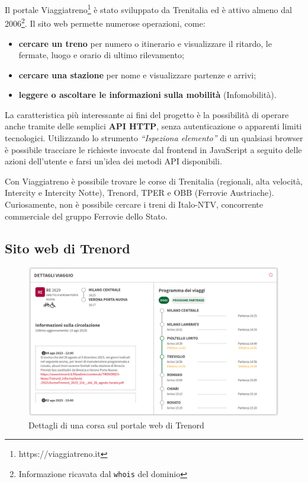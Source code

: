 \documentclass[12pt,italian]{report}
\begin{document}
Il portale Viaggiatreno\footnote{https://viaggiatreno.it} è stato
sviluppato da Trenitalia ed è attivo almeno dal
2006\footnote{Informazione ricavata dal \texttt{whois} del dominio}.
Il sito web permette numerose operazioni, come:
\begin{itemize}
	\item \textbf{cercare un treno} per numero o itinerario e
    visualizzare il ritardo, le fermate, luogo e orario di ultimo
    rilevamento;
	\item \textbf{cercare una stazione} per nome e visualizzare
    partenze e arrivi;
	\item \textbf{leggere o ascoltare le informazioni sulla mobilità}
    (Infomobilità).
\end{itemize}

La caratteristica più interessante ai fini del progetto è la
possibilità di operare anche tramite delle semplici \textbf{API HTTP},
senza autenticazione o apparenti limiti tecnologici.  Utilizzando lo
strumento \textit{``Ispeziona elemento''} di un qualsiasi browser è
possibile tracciare le richieste invocate dal frontend in JavaScript a
seguito delle azioni dell'utente e farsi un'idea dei metodi API
disponibili.

Con Viaggiatreno è possibile trovare le corse di Trenitalia
(regionali, alta velocità, Intercity e Intercity Notte), Trenord, TPER
e OBB (Ferrovie Austriache).  Curiosamente, non è possibile cercare i
treni di Italo-NTV, concorrente commerciale del gruppo Ferrovie dello
Stato.

\subsection{Sito web di Trenord}

\begin{figure}[h]
	\centering
    \includegraphics[width=1\textwidth]{images/trenord_api.png}
	\caption{Dettagli di una corsa sul portale web di Trenord}
\end{figure}
\end{document}
